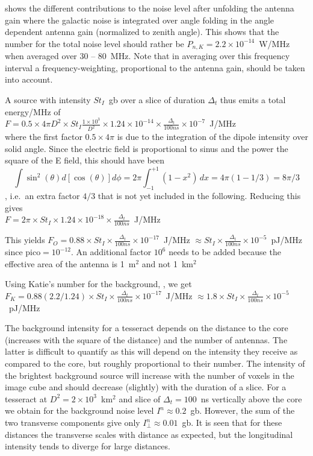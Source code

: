 { shows the different contributions to the noise level after unfolding the antenna gain where the galactic noise is integrated over angle folding in the angle dependent antenna gain (normalized to zenith angle). This shows that the number for the total noise level should rather be $P_{n,K}=2.2\times 10^{-14}$~W/MHz when averaged over 30 -- 80~MHz. Note that in averaging over this frequency interval a frequency-weighting, proportional to the antenna gain, should be taken into account.

A source with intensity $St_I$~gb over a slice of duration $\Delta_t$ thus emits a total energy/MHz of
\\$F=0.5\times 4\pi D^2 \times St_I \frac{1\times 10^3}{D^2}\times 1.24\times 10^{-14}\times\frac{\Delta_t}{100ns}\times 10^{-7}$~J/MHz
\\where the first factor $0.5\times 4\pi$ is due to the integration of the dipole intensity over solid angle. Since the electric field is proportional to sinus and the power the square of the E field, this should have been $$\int \sin^2(\theta) d[\cos(\theta)] d\phi=2\pi \int_{-1}^{+1} (1-x^2)\,dx=4\pi(1-1/3)=8\pi/3$$, i.e.\ an extra factor $4/3$ that is not yet included in the following. Reducing this gives
\\$F=2\pi  \times St_I  \times 1.24\times 10^{-18}\times\frac{\Delta_t}{100ns} $~J/MHz


 This yields
$F_O=0.88 \times St_I\times\frac{\Delta_t}{100ns} \times 10^{-17} $~J/MHz $\approx St_I\times\frac{\Delta_t}{100ns} \times 10^{-5} $~pJ/MHz since pico$=10^{-12}$. An additional factor $10^6$ needs to be added because the effective area of the antenna is 1~m$^2$ and not 1~km$^2$

Using Katie's number for the background, , we get $F_K=0.88 (2.2/1.24) \times St_I \times \frac{\Delta_t}{100ns} \times 10^{-17} $~J/MHz $\approx 1.8 \times St_I \times \frac{\Delta_t}{100ns} \times 10^{-5} $~pJ/MHz

The background intensity for a tesseract depends on the distance to the core (increases with the square of the distance) and the number of antennas. The latter is difficult to quantify as this will depend on the intensity they receive as compared to the core, but roughly proportional to their number. The intensity of the brightest background source will increase with the number of voxels in the image cube and should decrease (slightly) with the duration of a slice. For a tesseract at $D^2=2\times 10^3$~km$^2$ and slice of $\Delta_t=100$~ns vertically above the core we obtain for the background noise level $I^n \approx 0.2$~gb. However, the sum of the two transverse components give only $I_{\perp}^n \approx 0.01$~gb. It is seen that for these distances the transverse scales with distance as expected, but the longitudinal intensity tends to diverge for large distances.

}
